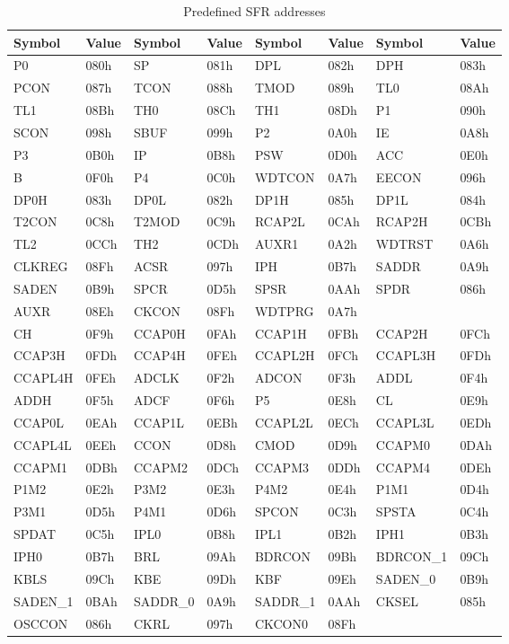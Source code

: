 \documentclass[a4paper,twoside,12pt]{book}
\newcommand{\mysmallfont}{\fontsize{8pt}{10pt} \selectfont{}}
\begin{document}
		\begin{table}[h!]
			\centering{}
			\mysmallfont{}
			\caption{Predefined SFR addresses}
			\begin{tabular}{|ll|ll|ll|ll|}
				\hline
				\textbf{Symbol}	& \textbf{Value}
					& \textbf{Symbol} & \textbf{Value}
					& \textbf{Symbol} & \textbf{Value}
					& \textbf{Symbol} & \textbf{Value} \\
				\hline
				P0	& 080h	& SP	& 081h	& DPL	& 082h	& DPH	& 083h \\
				PCON	& 087h	& TCON	& 088h	& TMOD	& 089h	& TL0	& 08Ah \\
				TL1	& 08Bh	& TH0	& 08Ch	& TH1	& 08Dh	& P1	& 090h \\
				SCON	& 098h	& SBUF	& 099h	& P2	& 0A0h	& IE	& 0A8h \\
				P3	& 0B0h	& IP	& 0B8h	& PSW	& 0D0h	& ACC	& 0E0h \\
				B	& 0F0h	& P4	& 0C0h	& WDTCON& 0A7h	& EECON	& 096h \\
				DP0H	& 083h	& DP0L	& 082h	& DP1H	& 085h	& DP1L	& 084h \\
				T2CON	& 0C8h	& T2MOD	& 0C9h	& RCAP2L& 0CAh	& RCAP2H& 0CBh \\
				TL2	& 0CCh	& TH2	& 0CDh	& AUXR1	& 0A2h	& WDTRST& 0A6h \\
				CLKREG	& 08Fh	& ACSR	& 097h	& IPH	& 0B7h	& SADDR	& 0A9h \\
				SADEN	& 0B9h	& SPCR	& 0D5h	& SPSR	& 0AAh	& SPDR	& 086h \\
				AUXR	& 08Eh	& CKCON	& 08Fh	& WDTPRG& 0A7h	&	& \\
				\hline
				CH	& 0F9h	& CCAP0H& 0FAh	& CCAP1H& 0FBh	& CCAP2H& 0FCh \\
				CCAP3H	& 0FDh	& CCAP4H& 0FEh	&CCAPL2H& 0FCh	&CCAPL3H& 0FDh \\
				CCAPL4H	& 0FEh	& ADCLK	& 0F2h	& ADCON	& 0F3h	& ADDL	& 0F4h \\
				ADDH	& 0F5h	& ADCF	& 0F6h	& P5	& 0E8h	& CL	& 0E9h \\
				CCAP0L	& 0EAh	& CCAP1L& 0EBh	&CCAPL2L& 0ECh	&CCAPL3L& 0EDh \\
				CCAPL4L	& 0EEh	& CCON	& 0D8h	& CMOD	& 0D9h	& CCAPM0& 0DAh \\
				CCAPM1	& 0DBh	& CCAPM2& 0DCh	& CCAPM3& 0DDh	& CCAPM4& 0DEh \\
				P1M2	& 0E2h	& P3M2	& 0E3h	& P4M2	& 0E4h	& P1M1	& 0D4h \\
				P3M1	& 0D5h	& P4M1	& 0D6h	& SPCON	& 0C3h	& SPSTA	& 0C4h \\
				SPDAT	& 0C5h	& IPL0	& 0B8h	& IPL1	& 0B2h	& IPH1	& 0B3h \\
				IPH0	& 0B7h	& BRL	& 09Ah	& BDRCON& 09Bh	&BDRCON\_1& 09Ch \\
				KBLS	& 09Ch	& KBE	& 09Dh	& KBF	& 09Eh	&SADEN\_0& 0B9h \\
				SADEN\_1& 0BAh	&SADDR\_0& 0A9h	&SADDR\_1& 0AAh	& CKSEL	& 085h \\
				OSCCON	& 086h	& CKRL	& 097h	& CKCON0& 08Fh	&	& \\
				\hline
			\end{tabular}
		\end{table}
\end{document}
